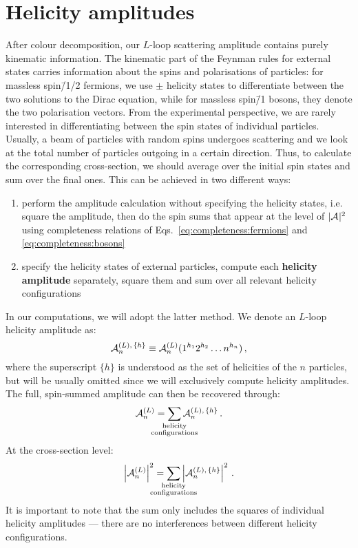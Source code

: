 \documentclass[main.tex]{subfiles}
\begin{document}
\section{Helicity amplitudes}
After colour decomposition, our $L$-loop scattering amplitude contains purely kinematic information. The kinematic part of the Feynman rules for external states carries information about the spins and polarisations of particles: for massless spin\=/1/2 fermions, we use $\pm$ helicity states to differentiate between the two solutions to the Dirac equation, while for massless spin\=/1 bosons, they denote the two polarisation vectors. From the experimental perspective, we are rarely interested in differentiating between the spin states of individual particles. Usually, a beam of particles with random spins undergoes scattering and we look at the total number of particles outgoing in a certain direction. Thus, to calculate the corresponding cross-section, we should average over the initial spin states and sum over the final ones. This can be achieved in two different ways: 
\begin{enumerate}
    \item perform the amplitude calculation without specifying the helicity states, i.e. square the amplitude, then do the spin sums that appear at the level of $|\mathcal{A}_{}^{}|^2$ using completeness relations of Eqs.~\ref{eq:completeness:fermions} and \ref{eq:completeness:bosons}
    \item specify the helicity states of external particles, compute each \textbf{helicity amplitude} separately, square them and sum over all relevant helicity configurations
\end{enumerate}
In our computations, we will adopt the latter method. We denote an $L$-loop helicity amplitude as:
\begin{equation} \label{eq:helampdef}
    \mathcal{A}_{n}^{(L),\,\{h\}} \equiv \mathcal{A}_{n}^{(L)}(1^{h_1}2^{h_2} \ldots n^{h_n})\,,
\end{equation}
where the superscript $\{h\}$ is understood as the set of helicities of the $n$ particles, but will be usually omitted since we will exclusively compute helicity amplitudes. The full, spin-summed amplitude can then be recovered through:
\begin{equation}
    \ampl{n}{(L)} = \sum_{\mathclap{\substack{\text{helicity} \\ \text{configurations}}}} \ampl{n}{(L),\,\{h\}} \,.
\end{equation}
At the cross-section level:
\begin{equation}
    \left|\ampl{n}{(L)}\right|^2 = \sum_{\mathclap{\substack{\text{helicity} \\ \text{configurations}}}} \left|\ampl{n}{(L),\,\{h\}} \right|^2 \,.
\end{equation}
It is important to note that the sum only includes the squares of individual helicity amplitudes --- there are no interferences between different helicity configurations.
\end{document}

